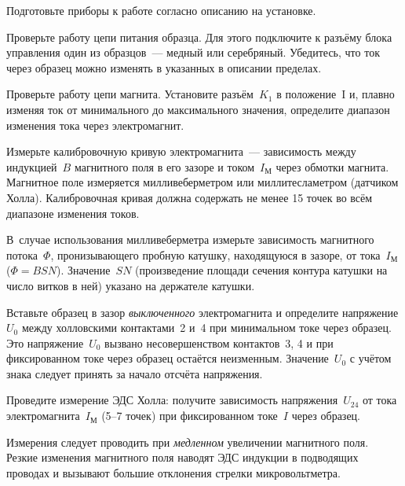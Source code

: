 \begin{lab:task}



\item Подготовьте приборы к работе согласно описанию на установке.

\item Проверьте работу цепи питания образца. Для этого подключите к разъёму
блока управления один из образцов~--- медный или серебряный. Убедитесь, что ток
через образец можно изменять в указанных в описании пределах.

\item Проверьте работу цепи магнита. Установите разъём~$K_1$ в положение~I и,
плавно изменяя ток от минимального до максимального значения, 
определите диапазон изменения тока через электромагнит.

\item Измерьте калибровочную кривую электромагнита~---
зависимость между индукцией~$B$ магнитного поля в его зазоре и 
током~$I_{М}$ через обмотки магнита.
Магнитное поле измеряется милливеберметром или миллитесламетром
(датчиком Холла). Калибровочная кривая должна содержать не менее
15 точек во всём диапазоне изменения токов.

В~случае использования милливеберметра измерьте зависимость 
магнитного потока~$\Phi$, пронизывающего пробную катушку, 
находящуюся в зазоре, от тока~$I_{М}$ ($\Phi=BSN$). 
Значение~$SN$ (произведение площади сечения контура катушки на
число витков в ней) указано на держателе катушки.

\item \label{p335-1} Вставьте образец в зазор \emph{выключенного} электромагнита 
и определите напряжение $U_0$ между холловскими
контактами~2 и~4 при минимальном токе через образец. 
Это напряжение~$U_0$ вызвано несовершенством контактов~3, 4 и при 
фиксированном токе через образец остаётся неизменным. Значение~$U_0$ с учётом 
знака следует принять за начало отсчёта напряжения.

\item \label{p335-2} Проведите измерение ЭДС Холла: получите зависимость 
напряжения~$U_{24}$ от тока электромагнита~$I_{М}$ (5--7 точек) 
при фиксированном токе~$I$ через образец.

Измерения следует проводить при \emph{медленном} увеличении магнитного поля. 
Резкие изменения магнитного поля наводят ЭДС индукции в подводящих проводах 
и вызывают большие отклонения стрелки микровольтметра.


\end{lab:task}
